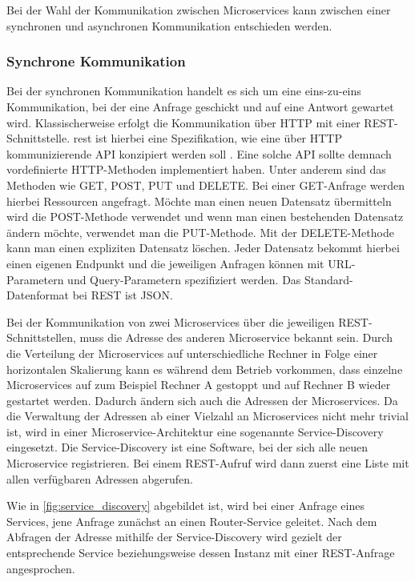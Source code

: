 Bei der Wahl der Kommunikation zwischen Microservices kann zwischen einer synchronen und asynchronen Kommunikation entschieden werden.

\subsubsection*{Synchrone Kommunikation}

Bei der synchronen Kommunikation handelt es sich um eine eins-zu-eins Kommunikation, bei der eine Anfrage geschickt und auf eine Antwort gewartet wird. Klassischerweise erfolgt die Kommunikation über HTTP mit einer REST-Schnittstelle. \gls{rest} ist hierbei eine Spezifikation, wie eine über HTTP kommunizierende API konzipiert werden soll \cite{MichaelSchwab.2019}. Eine solche API sollte demnach vordefinierte HTTP-Methoden implementiert haben. Unter anderem sind das Methoden wie GET, POST, PUT und DELETE. Bei einer GET-Anfrage werden hierbei Ressourcen angefragt. Möchte man einen neuen Datensatz übermitteln wird die POST-Methode verwendet und wenn man einen bestehenden Datensatz ändern möchte, verwendet man die PUT-Methode. Mit der DELETE-Methode kann man einen expliziten Datensatz löschen. Jeder Datensatz bekommt hierbei einen eigenen Endpunkt und die jeweiligen Anfragen können mit URL-Parametern und Query-Parametern spezifiziert werden. Das Standard-Datenformat bei REST ist JSON.

\label{service_discovery}Bei der Kommunikation von zwei Microservices über die jeweiligen REST-Schnittstellen, muss die Adresse des anderen Microservice bekannt sein. Durch die Verteilung der Microservices auf unterschiedliche Rechner in Folge einer horizontalen Skalierung kann es während dem Betrieb vorkommen, dass einzelne Microservices auf zum Beispiel Rechner A gestoppt und auf Rechner B wieder gestartet werden. Dadurch ändern sich auch die Adressen der Microservices. Da die Verwaltung der Adressen ab einer Vielzahl an Microservices nicht mehr trivial ist, wird in einer Microservice-Architektur eine sogenannte Service-Discovery eingesetzt. Die Service-Discovery ist eine Software, bei der sich alle neuen Microservice registrieren. Bei einem REST-Aufruf wird dann zuerst eine Liste mit allen verfügbaren Adressen abgerufen.

Wie in \autoref{fig:service_discovery} abgebildet ist, wird bei einer Anfrage eines Services, jene Anfrage zunächst an einen Router-Service geleitet. Nach dem Abfragen der Adresse mithilfe der Service-Discovery wird gezielt der entsprechende Service beziehungsweise dessen Instanz mit einer REST-Anfrage angesprochen.


